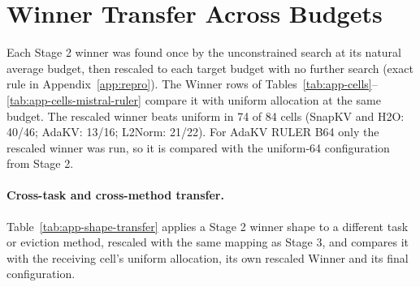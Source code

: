 \section{Winner Transfer Across Budgets}
\label{app:transfer}

Each Stage 2 winner was found once by the unconstrained search at its natural average budget, then rescaled to each target budget with no further search (exact rule in Appendix~\ref{app:repro}). The Winner rows of Tables~\ref{tab:app-cells}--\ref{tab:app-cells-mistral-ruler} compare it with uniform allocation at the same budget. The rescaled winner beats uniform in 74 of 84 cells (SnapKV and H2O: 40/46; AdaKV: 13/16; L2Norm: 21/22). For AdaKV RULER B64 only the rescaled winner was run, so it is compared with the uniform-64 configuration from Stage 2.


\paragraph{Cross-task and cross-method transfer.} Table~\ref{tab:app-shape-transfer} applies a Stage 2 winner shape to a different task or eviction method, rescaled with the same mapping as Stage 3, and compares it with the receiving cell's uniform allocation, its own rescaled Winner and its final configuration.


